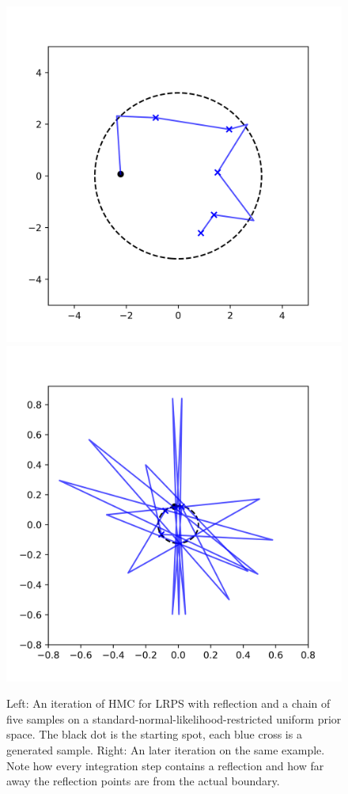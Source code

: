 \documentclass[12pt, a4paper]{report}
\begin{document}
\begin{figure}
    \centering
    \includegraphics[scale=0.45]{hmc_reflection_example.png}
    \includegraphics[scale=0.45]{hmc_reflection_degenerate_example.png}
    \caption{Left: An iteration of HMC for LRPS with reflection and a chain of five samples on a standard-normal-likelihood-restricted uniform prior space.
    The black dot is the starting spot, each blue cross is a generated sample. Right: An later iteration on the same example. Note how every integration step contains a reflection and how far away the reflection points are from the actual boundary.}
    \label{fig:hmc_example}
\end{figure}
\end{document}
